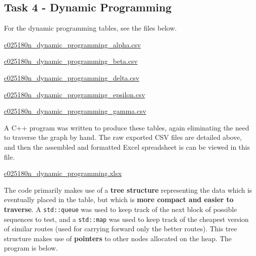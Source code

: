 \documentclass[
]{article}
\begin{document}
\newpage

\subsection{Task 4 - Dynamic
Programming}\label{task-4---dynamic-programming}

For the dynamic programming tables, see the files below.

\url{c025180n_dynamic_programming_alpha.csv}

\url{c025180n_dynamic_programming_beta.csv}

\url{c025180n_dynamic_programming_delta.csv}

\url{c025180n_dynamic_programming_epsilon.csv}

\url{c025180n_dynamic_programming_gamma.csv}

A C++ program was written to produce these tables, again eliminating the
need to traverse the graph by hand. The raw exported CSV files are
detailed above, and then the assembled and formatted Excel spreadsheet
is can be viewed in this file.

\url{c025180n_dynamic_programming.xlsx}

The code primarily makes use of a \textbf{tree structure} representing
the data which is eventually placed in the table, but which is
\textbf{more compact and easier to traverse}. A \texttt{std::queue} was
used to keep track of the next block of possible sequences to test, and
a \texttt{std::map} was used to keep track of the cheapest version of
similar routes (used for carrying forward only the better routes). This
tree structure makes use of \textbf{pointers} to other nodes allocated
on the heap. The program is below.
\end{document}
